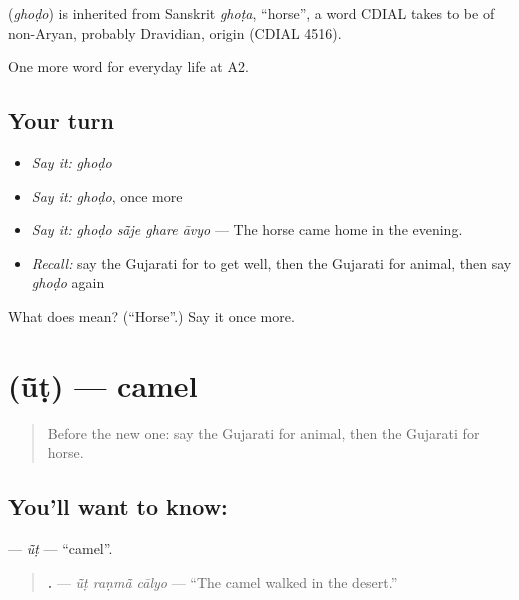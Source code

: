 \begin{cousinweb}
\textbf{} (\emph{ghoḍo}) is inherited from Sanskrit \emph{ghoṭa}, \textquotedblleft{}horse\textquotedblright{}, a word CDIAL takes to be of non-Aryan, probably Dravidian, origin (CDIAL 4516).
\end{cousinweb}

\begin{grammarlens}[title={What you've built}]
One more word for everyday life at A2.
\end{grammarlens}

\subsection*{Your turn}
\begin{itemize}
\raggedright
  \item \emph{Say it:} \emph{ghoḍo}
  \item \emph{Say it:} \emph{ghoḍo}, once more
  \item \emph{Say it:} \emph{ghoḍo sā̃je ghare āvyo} — The horse came home in the evening.
  \item \emph{Recall:} say the Gujarati for to get well, then the Gujarati for animal, then say \emph{ghoḍo} again
\end{itemize}

\begin{tcolorbox}[breakable,colback=teal!4,colframe=teal!35!black,title={Before you move on}]
What does  mean? (\textquotedblleft{}Horse\textquotedblright{}.) Say it once more.
\end{tcolorbox}
\section[\texorpdfstring{\gu{ઊંટ} (ū̃ṭ)}{ઊંટ (ū̃ṭ)}]{ (ū̃ṭ) — camel}

\label{lesson:GU-C233-ut}



\begin{quote}
Before the new one: say the Gujarati for animal, then the Gujarati for horse.
\end{quote}

\subsection*{You'll want to know: }
\textbf{} — \emph{ū̃ṭ} — \textquotedblleft{}camel\textquotedblright{}.

\begin{quote}
\textbf{  .} — \emph{ū̃ṭ raṇmā̃ cālyo} — \textquotedblleft{}The camel walked in the desert.\textquotedblright{}
\end{quote}

